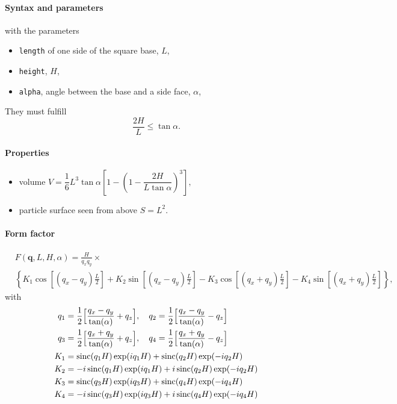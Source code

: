 \paragraph{Syntax and parameters}
\begin{quote}
\end{quote}
with the parameters
\begin{itemize}
\item \texttt{length} of one side of the square base, $L$,  
\item \texttt{height}, $H$,
\item \texttt{alpha}, angle between the base and a side face, $\alpha$,
\end{itemize}
They must fulfill
\begin{displaymath}
  \dfrac{2H}{L} \le \tan\alpha.
\end{displaymath}

\paragraph{Properties}
\begin{itemize}
\item  volume $V = \dfrac{1}{6}  L^3 \tan\alpha\left[ 1
             - \left(1 - \dfrac{2H}{L\tan\alpha}\right)^3 \right],$
\item particle surface seen from above $S = L^2$.
\end{itemize}

\paragraph{Form factor}
\begin{align*}
&F(\mathbf{q},L, H, \alpha) =
\frac{H}{q_x q_y} \times \nonumber \\ &\left\{ K_1 \cos\left[
  (q_x-q_y)\frac{L}{2} \right] + K_2 \sin\left[ (q_x-q_y)\frac{L}{2} \right]
- K_3 \cos\left[ (q_x+q_y) \frac{L}{2} \right] - K_4 \sin\left[ (q_x+q_y)\frac{L}{2} \right]\right\},
\end{align*}
with
\begin{align*}
       q_1 &=\frac{1}{2}\Big[\frac{q_x-q_y}{\tan(\alpha)} + q_z\Big],\quad       q_2 =\frac{1}{2}\Big[\frac{q_x-q_y}{\tan(\alpha)} - q_z\Big]\\
        q_3 &=\frac{1}{2}\Big[\frac{q_x+q_y}{\tan(\alpha)} + q_z\Big],\quad       q_4 =\frac{1}{2}\Big[\frac{q_x+q_y}{\tan(\alpha)} - q_z\Big]\\
        K_1 &= \operatorname{sinc}(q_1 H)\exp(i q_1 H)  + \operatorname{sinc}(q_2 H) \exp(-i q_2 H)\\
        K_2 &= -i \operatorname{sinc}(q_1 H) \exp(i q_1 H) +i \operatorname{sinc}(q_2 H) \exp(-i q_2 H)\\
        K_3 &= \operatorname{sinc}(q_3 H) \exp(i q_3 H)    + \operatorname{sinc}(q_4 H) \exp(-i q_4 H)\\
        K_4 &= -i \operatorname{sinc}(q_3 H) \exp(i q_3 H) + i \operatorname{sinc}(q_4 H) \exp(-i q_4 H) 
   \end{align*}


